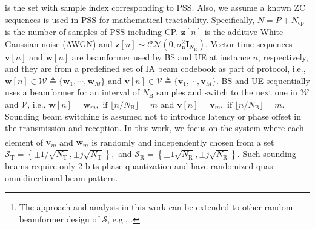 \documentclass[journal]{IEEEtran}
\newcommand{\tx}[0]{\text{T}}
\newcommand{\rx}[0]{\text{R}}
\newcommand{\Nb}[0]{N_{\text{B}}}
\newcommand{\Ncp}[0]{N_{\text{cp}}}
\newcommand{\sigman}[0]{\sigma_{\text{n}}}
\begin{document}
is the set with sample index corresponding to PSS. \color{black} Also, we assume a known ZC sequences is used in PSS for mathematical tractability. \color{black} Specifically, $N=P+\Ncp$ is the number of samples of PSS including CP.
$\mathbf{z}[n]$ is the additive White Gaussian noise (AWGN) and $\mathbf{z}[n]\sim \mathcal{CN}(0,\sigman^2\mathbf{I}_{N_{\rx}})$. Vector time sequences $\mathbf{v}[n]$ and $\mathbf{w}[n]$ are beamformer used by BS and UE at instance $n$, respectively, and they are from a predefined set of IA beam codebook as part of protocol, i.e., $\mathbf{w}[n] \in \mathcal{W}\triangleq \{\mathbf{w}_1,\cdots,\mathbf{w}_M\}$ and $\mathbf{v}[n] \in \mathcal{V}\triangleq \{\mathbf{v}_1,\cdots,\mathbf{v}_M\}$. BS and UE sequentially uses a beamformer for an interval of $\Nb$ samples and switch to the next one in $\mathcal{W}$ and $\mathcal{V}$, i.e.,
$\mathbf{w}[n] =  \mathbf{w}_m, \text{ if }\lfloor n/\Nb\rfloor = m$ and $\mathbf{v}[n] =  \mathbf{v}_m, \text{ if }\lfloor n/\Nb\rfloor = m.$ Sounding beam switching is assumed not to introduce latency or phase offset in the transmission and reception.
In this work, we focus on the system where each element of $\mathbf{v}_m$ and $\mathbf{w}_m$ is randomly and independently chosen from a set\footnote{The approach and analysis in this work can be extended to other random beamformer design of $\mathcal{S}$, e.g., \cite{7400949,8323164}.} 
$\mathcal{S}_{\tx} = \left\{\pm 1/\sqrt{N_{\tx}},\pm j\sqrt{N_{\tx}}\right\},$ and
$\mathcal{S}_{\rx} = \left\{\pm 1\sqrt{N_{\rx}},\pm j\sqrt{N_{\rx}}\right\}.$
Such sounding beams require only 2 bits phase quantization and have randomized quasi-omnidirectional beam pattern.
\end{document}
